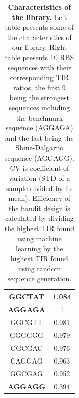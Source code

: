 \documentclass{article}
\begin{document}
\begin{table}[!h]
\begin{minipage}[c]{0.38\textwidth}
\begin{tabular}{|c|c|}
GGCTAT                & 1.084              \\ \hline
\textbf{AGGAGA}                & 1                  \\ \hline
GGCGTT                & 0.981            \\ \hline
GGGGGG                & 0.979             \\ \hline
GGCGAC                & 0.976             \\ \hline
CAGGAG                & 0.963             \\ \hline
GGCGAG                & 0.952             \\ \hline
\textbf{AGGAGG}                & 0.394            \\ \hline
\end{tabular}
\end{minipage}
\caption{\textbf{Characteristics of the library.}
Left table presents some of the characteristics of our library.
Right table presents 10 RBS sequences with their corresponding TIR ratios, the first 9 being the strongest sequences including the benchmark sequence (AGGAGA) and the last being the Shine-Dalgarno sequence (AGGAGG).
CV is coefficient of variation (STD of a sample divided by its mean).
Efficiency of the bandit design is calculated by dividing the highest TIR found using machine learning by the highest TIR found using random sequence generation. }
\end{table}
\end{document}
